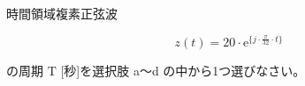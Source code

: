 時間領域複素正弦波

\[
z(t) =  20 \cdot \textrm{e}^{\{ j \cdot \frac{\pi}{32} \cdot t \}}
\]

\bigskip
\noindent の周期 $\textrm{T}$ [秒]を選択肢 a〜d の中から1つ選びなさい。
